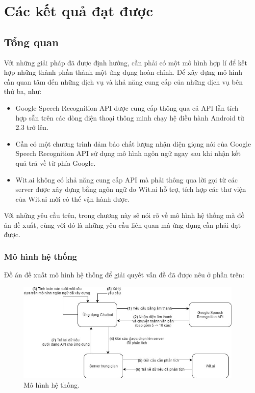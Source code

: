 \documentclass[12pt]{report}
\begin{document}
\stopcontents[parts]

\part{Các kết quả đạt được}
\startcontents[parts]

\chapter{Tổng quan}

Với những giải pháp đã được định hướng, cần phải có một mô hình hợp lí để kết hợp những thành phần thành một ứng dụng hoàn chỉnh. Để xây dựng mô hình cần quan tâm đến những dịch vụ và khả năng cung cấp của những dịch vụ bên thứ ba, như:

\begin{itemize}
	\item Google Speech Recognition API được cung cấp thông qua cả API lẫn tích hợp sẵn trên các dòng điện thoại thông minh chạy hệ điều hành Android từ 2.3 trở lên.
	\item Cần có một chương trình đảm bảo chất lượng nhận diện giọng nói của Google Speech Recognition API sử dụng mô hình ngôn ngữ ngay sau khi nhận kết quả trả về từ phía Google.
	\item Wit.ai không có khả năng cung cấp API mà phải thông qua lời gọi từ các server được xây dựng bằng ngôn ngữ do Wit.ai hỗ trợ, tích hợp các thư viện của Wit.ai mới có thể vận hành được.
\end{itemize}

Với những yêu cầu trên, trong chương này sẽ nói rõ về mô hình hệ thống mà đồ án đề xuất, cùng với đó là những yêu cầu liên quan mà ứng dụng cần phải đạt được.

\section{Mô hình hệ thống}
Đồ án đề xuất mô hình hệ thống để giải quyết vấn đề đã được nêu ở phần trên:

\begin{figure}[H]
	\centering
		\includegraphics[width=12cm]{Pics/Chap2/VVC.jpg}
	\caption{Mô hình hệ thống.}
	\label{fig:VVC}
\end{figure}
\end{document}
